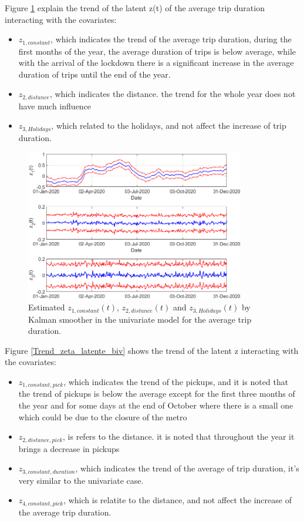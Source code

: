 Figure \ref{Trend_zeta_latente univariato} explain the trend of the latent z(t) of the average trip duration interacting with the covariates:
\begin{itemize}
	\item $z_{1,constant}$, which indicates the trend of the average trip duration, during the first months of the year, the average duration of trips is below average, while with the arrival of the lockdown there is a significant increase in the average duration of trips until the end of the year.
	\item $z_{2,distance}$, which indicates the distance. the trend for the whole year does not have much influence
	\item $z_{3,Holidays}$, which related to the holidays, and not affect the increase of trip duration.
\end{itemize}
\noindent


\begin{figure}[h!]
	\centering
	\includegraphics[height=250px]{Images/Data analysis/DCM/trend_z_selected_trip_model.png}
	\caption[Estimated $z_{1}(t)$,  $z_{2}(t)$ and $z_{3}(t)$ by Kalman smoother in the univariate model for pickups (DCM)]{Estimated $z_{1,constant}(t)$,  $z_{2,distance}(t)$ and $z_{3,Holidays}(t)$ by Kalman smoother in the univariate model for the average trip duration.}
	\label{Trend_zeta_latente univariato}
	
\end{figure}

\noindent
Figure \ref{Trend_zeta_latente_biv} shows the trend of the latent z interacting with the covariates:
\begin{itemize}
	\item $z_{1,constant,pick}$, which indicates the trend of the pickups, and it is noted that the trend of pickups is below the average except for the first three months of the year and for some days at the end of October where there is a small one which could be due to the closure of the metro
	\item $z_{2,distance,pick}$, is refers to the distance. it is noted that throughout the year it brings a decrease in pickups
	\item $z_{3,constant,duration}$, which indicates the trend of the average of trip duration, it's very similar to the univariate case.
	\item $z_{4,constant,pick}$, which is relatite to the distance, and not affect the increase of the average trip duration.
\end{itemize}

